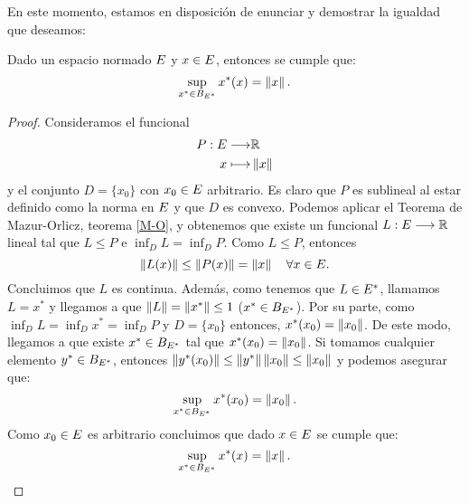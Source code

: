 En este momento, estamos en disposición de enunciar y demostrar la igualdad que deseamos:
\begin{proposicionBox}
	Dado un espacio normado $ E $ y $ x \in E $, entonces se cumple que:
	\begin{equation}\label{iguNorm}
	\sup_{x^* \in B_{E ^ *}} x^*(x) = \left\Vert x\right\Vert.
	\end{equation}
\end{proposicionBox}
\begin{proof}
Consideramos el funcional 
\begin{equation*}
\begin{split}
P:E \longrightarrow &\mathbb{R} \\
x \longmapsto &\left\Vert x\right\Vert
\end{split}
\end{equation*} 
y el conjunto $ D = \{x_0\} $ con $ x_0 \in E $ arbitrario. Es claro que $ P $ es sublineal al estar definido como la norma en $ E $ y que $ D $ es convexo. Podemos aplicar el Teorema de Mazur-Orlicz, teorema \ref{M-O}, y obtenemos que existe un funcional $ L:E \longrightarrow \mathbb{R} $ lineal tal que $ L \leq P $ e $ \inf_D L = \inf_D P $. Como $ L \leq P $, entonces 
\begin{equation*}
 	\left\Vert L(x)\right\Vert \leq \left\Vert P(x)\right\Vert = \left\Vert x\right\Vert \quad \forall x \in E.
\end{equation*}
Concluimos que $ L $ es continua. Además, como tenemos que $ L \in E ^* $, llamamos $ L = x^* $ y llegamos a que $ \left\Vert L\right\Vert = \left\Vert x^*\right\Vert  \leq 1$ ($ x^* \in  B_{E ^ *} $).  Por su parte, como  $ \inf_D L = \inf_D x^* = \inf_D P $ y $ D = \{x_0\} $ entonces, $ x^*(x_0) = \left\Vert x_0\right\Vert $. De este modo, llegamos a que existe $ x^* \in B_{E^*} $ tal que $ x^*(x_0) = \left\Vert x_0\right\Vert $. Si tomamos cualquier elemento $ y^* \in B_{E^*}  $, entonces $ \left\Vert y^*(x_0)\right\Vert \leq \left\Vert y^*\right\Vert \left\Vert x_0\right\Vert \leq \left\Vert x_0\right\Vert $ y podemos asegurar que:
\[
\sup_{x^* \in B_{E ^ *}} x^*(x_0) = \left\Vert x_0\right\Vert.
\] 
Como $ x_0 \in E $ es arbitrario concluimos que dado $ x \in E $ se cumple que:
\begin{equation*}
\sup_{x^* \in B_{E ^ *}} x^*(x) = \left\Vert x\right\Vert.
\end{equation*}
\end{proof}
